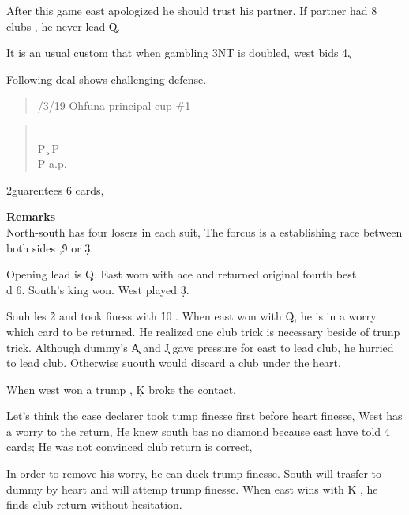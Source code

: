 {After this game east apologized he should trust his partner. If partner had
8 clubs , he never lead \c Q. 

It is an usual custom that when gambling 3NT is doubled, west bids 4\c.

Following deal shows challenging defense.

\begin{quote}
/3/19  Ohfuna principal cup \#1
%
  {}%
  {}%
  {}%
  {}%
\end{quote}
\begin{quote}
\begin{bidding}
- \> - \> - \s   \\
P \c  \> P \s  \\
P \s \> a.p.
\end{bidding}
 \end{quote}

2\s guarentees 6  cards,

{\bf Remarks}\\

North-south has four losers in each suit,
The forcus is a establishing race between both sides
,\h 9 or \d 3.

Opening lead is \d Q. East wom with ace and returned original
fourth best \\d 6. South's king won. West played \d 3.

Souh les \h 2 and took finess with \h 10 .
When east won with \h Q, he is in a worry which card to be returned.
He realized one club trick is necessary beside of trunp trick.
Although dummy's \c A and \c J gave pressure for east to lead club,
he hurried to lead club. Otherwise suouth would discard a club under
the heart.

When west won a trump , \c K broke the contact.

Let's think the case declarer took tump finesse first 
before heart finesse, West has a worry to the return,
He knew south  bas no diamond because east have told 4 cards;
He was not convinced club return is correct,

In order to remove his worry, he can duck trump finesse.
South will trasfer to dummy by heart and will attemp trump
finesse. When east wins with \s K ,
he finds club return without hesitation.

}
